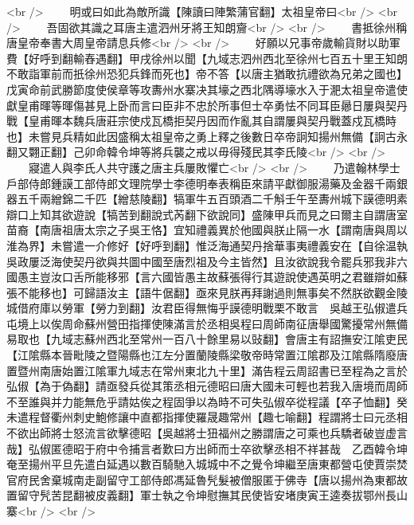 <br />
　　明或曰如此為敵所識【陳讀曰陣繁蒲官翻】太祖皇帝曰<br />
<br />
　　吾固欲其識之耳唐主遣泗州牙將王知朗齎<br />
<br />
　　書抵徐州稱唐皇帝奉書大周皇帝請息兵修<br />
<br />
　　好願以兄事帝歲輸貨財以助軍費【好呼到翻輸舂遇翻】甲戌徐州以聞【九域志泗州西北至徐州七百五十里王知朗不敢詣軍前而扺徐州恐犯兵鋒而死也】帝不答【以唐主猶敢抗禮欲為兄弟之國也】戊寅命前武勝節度使侯章等攻夀州水寨决其壕之西北隅導壕水入于淝太祖皇帝遣使獻皇甫暉等暉傷甚見上卧而言曰臣非不忠於所事但士卒勇怯不同耳臣曏日屢與契丹戰【皇甫暉本魏兵唐莊宗使戍瓦橋拒契丹因而作亂其自謂屢與契丹戰蓋戍瓦橋時也】未嘗見兵精如此因盛稱太祖皇帝之勇上釋之後數日卒帝詗知揚州無備【詗古永翻又翾正翻】己卯命韓令坤等將兵襲之戒以毋得殘民其李氏陵<br />
<br />
　　寢遣人與李氏人共守護之唐主兵屢敗懼亡<br />
<br />
　　乃遣翰林學士戶部侍郎鍾謨工部侍郎文理院學士李德明奉表稱臣來請平獻御服湯藥及金器千兩銀器五千兩繒錦二千匹【繒慈陵翻】犒軍牛五百頭酒二千斛壬午至夀州城下謨德明素辯口上知其欲遊說【犒苦到翻說式芮翻下欲說同】盛陳甲兵而見之曰爾主自謂唐室苗裔【南唐祖唐太宗之子吳王恪】宜知禮義異於他國與朕止隔一水【謂南唐與周以淮為界】未嘗遣一介修好【好呼到翻】惟泛海通契丹捨華事夷禮義安在【自徐温執吳政屢泛海使契丹欲與共圖中國至唐烈祖及今主皆然】且汝欲說我令罷兵邪我非六國愚主豈汝口舌所能移邪【言六國皆愚主故蘇張得行其遊說使遇英明之君雖辯如蘇張不能移也】可歸語汝主【語牛倨翻】亟來見朕再拜謝過則無事矣不然朕欲觀金陵城借府庫以勞軍【勞力到翻】汝君臣得無悔乎謨德明戰栗不敢言　吳越王弘俶遣兵屯境上以俟周命蘇州營田指揮使陳滿言於丞相吳程曰周師南征唐舉國驚擾常州無備易取也【九域志蘇州西北至常州一百八十餘里易以䜴翻】會唐主有詔撫安江隂吏民【江隂縣本晉毗陵之暨陽縣也江左分置蘭陵縣梁敬帝時常置江隂郡及江隂縣隋廢唐置暨州南唐始置江隂軍九域志在常州東北九十里】滿告程云周詔書已至程為之言於弘俶【為于偽翻】請亟發兵從其策丞相元德昭曰唐大國未可輕也若我入唐境而周師不至誰與并力能無危乎請姑俟之程固爭以為時不可失弘俶卒從程議【卒子恤翻】癸未遣程督衢州刺史鮑修讓中直都指揮使羅晟趣常州【趣七喻翻】程謂將士曰元丞相不欲出師將士怒流言欲擊德昭【吳越將士狃福州之勝謂唐之可乘也兵驕者破豈虚言哉】弘俶匿德昭于府中令捕言者歎曰方出師而士卒欲擊丞相不祥甚哉　乙酉韓令坤奄至揚州平旦先遣白延遇以數百騎馳入城城中不之覺令坤繼至唐東都營屯使賈崇焚官府民舍棄城南走副留守工部侍郎馮延魯髠髮被僧服匿于佛寺【唐以揚州為東都故置留守髠苦昆翻被皮義翻】軍士執之令坤慰撫其民使皆安堵庚寅王逵奏拔鄂州長山寨<br />
<br />
